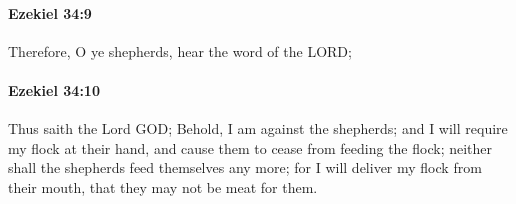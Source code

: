 		\paragraph{Ezekiel 34:9} %
			\label{EZEKIEL-34-9}

			Therefore, O ye shepherds, hear the word of the LORD;


		\paragraph{Ezekiel 34:10} %
			\label{EZEKIEL-34-10}

			Thus saith the Lord GOD; Behold, I am against the shepherds; and I will require my flock at their hand, and cause them to cease from feeding the flock; neither shall the shepherds feed themselves any more; for I will deliver my flock from their mouth, that they may not be meat for them.


